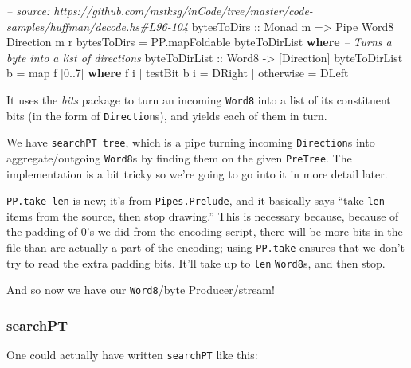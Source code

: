 \documentclass[]{article}
\newenvironment{Shaded}{}{}
\newcommand{\KeywordTok}[1]{\textcolor[rgb]{0.00,0.44,0.13}{\textbf{{#1}}}}
\newcommand{\DataTypeTok}[1]{\textcolor[rgb]{0.56,0.13,0.00}{{#1}}}
\newcommand{\DecValTok}[1]{\textcolor[rgb]{0.25,0.63,0.44}{{#1}}}
\newcommand{\CommentTok}[1]{\textcolor[rgb]{0.38,0.63,0.69}{\textit{{#1}}}}
\newcommand{\OtherTok}[1]{\textcolor[rgb]{0.00,0.44,0.13}{{#1}}}
\newcommand{\FunctionTok}[1]{\textcolor[rgb]{0.02,0.16,0.49}{{#1}}}
\newcommand{\NormalTok}[1]{{#1}}
\begin{document}
\begin{Shaded}
\begin{Highlighting}[]
\CommentTok{-- source: https://github.com/mstksg/inCode/tree/master/code-samples/huffman/decode.hs#L96-104}
\OtherTok{bytesToDirs ::} \DataTypeTok{Monad} \NormalTok{m }\OtherTok{=>} \DataTypeTok{Pipe} \DataTypeTok{Word8} \DataTypeTok{Direction} \NormalTok{m r}
\NormalTok{bytesToDirs }\FunctionTok{=} \NormalTok{PP.mapFoldable byteToDirList}
  \KeywordTok{where}
    \CommentTok{-- Turns a byte into a list of directions}
\OtherTok{    byteToDirList ::} \DataTypeTok{Word8} \OtherTok{->} \NormalTok{[}\DataTypeTok{Direction}\NormalTok{]}
    \NormalTok{byteToDirList b }\FunctionTok{=} \NormalTok{map f [}\DecValTok{0}\FunctionTok{..}\DecValTok{7}\NormalTok{]}
      \KeywordTok{where}
        \NormalTok{f i }\FunctionTok{|} \NormalTok{testBit b i }\FunctionTok{=} \DataTypeTok{DRight}
            \FunctionTok{|} \NormalTok{otherwise   }\FunctionTok{=} \DataTypeTok{DLeft}
\end{Highlighting}
\end{Shaded}

It uses the \emph{bits} package to turn an incoming \texttt{Word8} into
a list of its constituent bits (in the form of \texttt{Direction}s), and
yields each of them in turn.

We have \texttt{searchPT\ tree}, which is a pipe turning incoming
\texttt{Direction}s into aggregate/outgoing \texttt{Word8}s by finding
them on the given \texttt{PreTree}. The implementation is a bit tricky
so we're going to go into it in more detail later.

\texttt{PP.take\ len} is new; it's from \texttt{Pipes.Prelude}, and it
basically says ``take \texttt{len} items from the source, then stop
drawing.'' This is necessary because, because of the padding of 0's we
did from the encoding script, there will be more bits in the file than
are actually a part of the encoding; using \texttt{PP.take} ensures that
we don't try to read the extra padding bits. It'll take up to
\texttt{len} \texttt{Word8}s, and then stop.

And so now we have our \texttt{Word8}/byte Producer/stream!

\subsubsection{searchPT}\label{searchpt}

One could actually have written \texttt{searchPT} like this:
\end{document}
